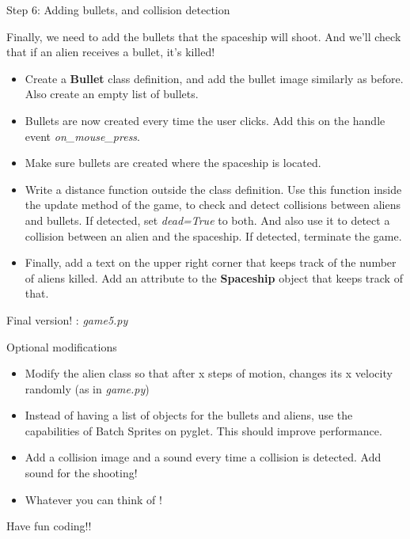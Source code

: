 \documentclass[10pt]{beamer}
\begin{document}
\begin{frame}{Step 6: Adding bullets, and collision detection}

Finally, we need to add the bullets that the spaceship will shoot. And we'll check that if an alien receives a bullet, it's killed!

\begin{itemize}

\item Create a \textbf{Bullet} class definition, and add the bullet image similarly as before. Also create an empty list of bullets.

\item Bullets are now created every time the user clicks. Add this on the handle event \textit{on\_mouse\_press}.

\item Make sure bullets are created where the spaceship is located. 

\item Write a distance function outside the class definition. Use this function inside the update method of the game, to check and detect collisions between aliens and bullets. If detected, set \textit{dead=True} to both. And also use it to detect a collision between an alien and the spaceship. If detected, terminate the game.

\item Finally, add a text on the upper right corner that keeps track of the number of aliens killed. Add an attribute to the \textbf{Spaceship} object that keeps track of that.

\end{itemize}

\vfill
\small{Final version! : \textit{game5.py} }
\end{frame}

\begin{frame}{Optional modifications}

\begin{itemize}

\item Modify the alien class so that after x steps of motion, changes its x velocity randomly (as in \textit{game.py})

\item Instead of having a list of objects for the bullets and aliens, use the capabilities of Batch Sprites on pyglet. This should improve performance.

\item Add a collision image and a sound every time a collision is detected. Add sound for the shooting!

\item Whatever you can think of !

\end{itemize}
\end{frame}


\begin{frame}{}
\center
\huge{Have fun coding!!}

\end{frame}
\end{document}
